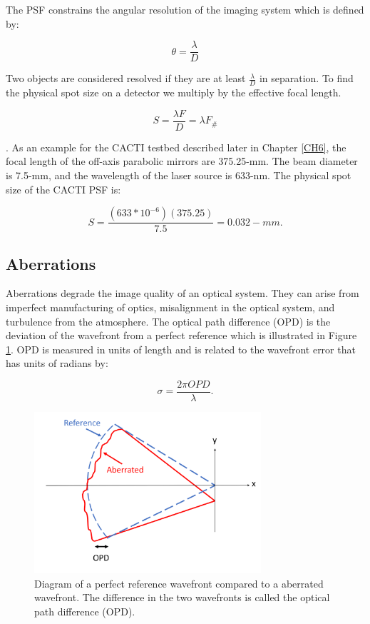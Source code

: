 The PSF constrains the angular resolution of the imaging system which is defined by:

\begin{equation}
    \theta=\frac{\lambda}{D}
    \label{res}
\end{equation}
 
Two objects are considered resolved if they are at least $\frac{ \lambda}{D}$ in separation. To find the physical spot size on a detector we multiply by the effective focal length.

\begin{equation}
S=\frac{ \lambda F}{D} = \lambda F_\#
\end{equation}

\noindent. As an example for the CACTI testbed described later in Chapter \ref{CH6}, the focal length of the off-axis parabolic mirrors are 375.25-mm. The beam diameter is 7.5-mm, and the wavelength of the laser source is 633-nm. The physical spot size of the CACTI PSF is:

\begin{equation}
S=\frac{ (633*10^{-6})(375.25)}{7.5} = 0.032-mm.
\end{equation}

\subsection{Aberrations}

Aberrations degrade the image quality of an optical system. They can arise from imperfect manufacturing of optics, misalignment in the optical system, and turbulence from the atmosphere. The optical path difference (OPD) is the deviation of the wavefront from a perfect reference which is illustrated in Figure \ref{fig:OPD}. OPD is measured in units of length and is related to the wavefront error that has units of radians by:

\begin{equation}
    \sigma= \frac{2\pi OPD}{\lambda}.
\end{equation}

\begin{figure}
    \centering
    \includegraphics[width=0.75\textwidth]{Chapter Materials/Introduction Materials/Introduction Figures/OPD.png}
    \caption{Diagram of a perfect reference wavefront compared to a aberrated wavefront. The difference in the two wavefronts is called the optical path difference (OPD).}
    \label{fig:OPD}
\end{figure}

